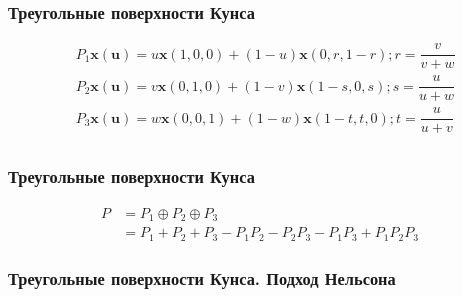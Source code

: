 \documentclass[14pt]{beamer}
\begin{document}
\begin{frame}
\frametitle{Треугольные поверхности Кунса}
\begin{align*}
  &P_1\bm{x(u)} = u\bm{x}(1, 0, 0) + (1 - u)\bm{x}(0, r, 1 - r); r = \dfrac{v}{v + w}\\
  &P_2\bm{x(u)} = v\bm{x}(0, 1, 0) + (1 - v)\bm{x}(1 - s, 0, s); s = \dfrac{u}{u + w}\\
  &P_3\bm{x(u)} = w\bm{x}(0, 0, 1) + (1 - w)\bm{x}(1 - t, t, 0); t = \dfrac{u}{u + v}\\
\end{align*}
\end{frame}

\begin{frame}
\frametitle{Треугольные поверхности Кунса}
\begin{align*}
  P &= P_1 \oplus P_2 \oplus P_3\\
    &= P_1 + P_2 + P_3 - P_1P_2 - P_2P_3 - P_1P_3 + P_1P_2P_3
\end{align*}
\end{frame}

\begin{frame}
\frametitle{Треугольные поверхности Кунса. Подход Нельсона}
\end{frame}
\end{document}
